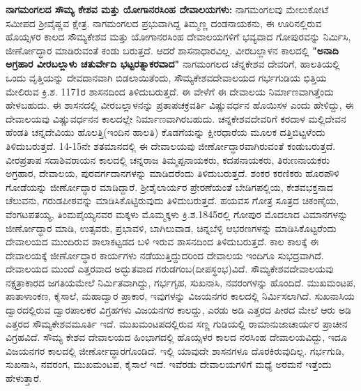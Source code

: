 \textbf{ನಾಗಮಂಗಲದ ಸೌಮ್ಯ ಕೇಶವ ಮತ್ತು ಯೋಗಾನರಸಿಂಹ ದೇವಾಲಯಗಳು:} ನಾಗಮಂಗಲವು ಮೇಲುಕೋಟೆ ಸಮೀಪದ ಶ‍್ರೀವೈಷ್ಣವ ಕ್ಷೇತ್ರ. ನಾಗಮಂಗಲದ ಪ್ರಭುವಾಗಿದ್ದ ತಿಮ್ಮಣ್ಣ ದಂಡನಾಯಕನು, ಈ ಊರಿನಲ್ಲಿರುವ ಹೊಯ್ಸಳರ ಕಾಲದ ಸೌಮ್ಯಕೇಶವ ಮತ್ತು ಯೋಗಾನರಸಿಂಹ ದೇವಾಲಯಗಳಿಗೆ ಭವ್ಯವಾದ ಗೋಪುರವನ್ನು ನಿರ್ಮಿಸಿ, ಜೀರ್ಣೋದ್ಧಾರ ಮಾಡಿರುವಂತೆ ಕಂಡು ಬರುತ್ತದೆ. ಆದರೆ ಶಾಸನಾಧಾರವಿಲ್ಲ. ವೀರಬಲ್ಲಾಳನ ಕಾಲದಲ್ಲಿ \textbf{"ಅನಾದಿ ಅಗ್ರಹಾರ ವೀರಬಲ್ಲಾಳು ಚತುರ್ವೇದಿ ಭಟ್ಟರತ್ನಾಕರವಾದ"} ನಾಗಮಂಗಲದ ಚೆನ್ನಕೇಶವ ದೇವರಿಗೆ, ಹಾಲತಿಯಲ್ಲಿ ಒಂದು ವೃತ್ತಿಯನ್ನು ದೇವದಾನವಾಗಿ ಬಿಡಲಾಯಿತೆಂದು, ಸೌಮ್ಯಕೇಶವದೇವಾಲಯದ ಗರ್ಭಗುಡಿಯ ಭಿತ್ತಿಯ ಮೇಲಿರುವ ಕ್ರಿ.ಶ. 1171ರ ಶಾಸನದಿಂದ ತಿಳಿದುಬರುತ್ತದೆ. ಈ ವೇಳೆಗೆ ಈ ದೇವಾಲಯ ನಿರ್ಮಾಣವಾಗಿತ್ತೆಂದು ಹೇಳಬಹುದು. ಈ ಶಾಸನದಲ್ಲಿ ವೀರಬಲ್ಲಾಳನನ್ನು ಪ್ರತಾಪಚಕ್ರವರ್ತಿ ವಿಷ್ಣುವರ್ಧನ ಹೊಯಿಸಳ ಎಂದು ಹೇಳಿದ್ದು, ಈ ದೇವಾಲಯವು ವಿಷ್ಣುವರ್ಧನನ ಕಾಲದಲ್ಲೇ ನಿರ್ಮಾಣ\-ವಾಗಿರಬಹುದು. ಚನ್ನಕೇಶವದೇವರಿಗೆ ಕರದಾಳ ಮಲ್ಲಿದೇವನ ಹೆಂಡತಿ ಚನ್ನದೇವಿಯು ಹೊಲತ್ತಿ(ಇಂದಿನ ಹಾಲತಿ) ಕೊಡಗೆಯನ್ನು ಕ್ಷೀರಧಾರೆಯ ಮೂಲಕ ದತ್ತಿಬಿಟ್ಟಳೆಂದು ತಿಳಿದುಬರುತ್ತದೆ. 14-15ನೇ ಶತಮಾನದಲ್ಲಿ ಈ ದೇವಾಲಯವು ಜೀರ್ಣೋದ್ಧಾರವಾಗಿರುವಂತೆ ಕಂಡುಬರುತ್ತದೆ. ವೀರಪ್ರತಾಪ ಸದಾಶಿವರಾಯನ ಕಾಲದಲ್ಲಿ ಚನ್ನರಾಜ ತಿಮ್ಮಪ್ಪನಾಯಕರು, ಕದಪನಾಯಕರು, ತಿರುಣನಾಯಕರು ಅಗ್ರಹಾರ, ದೇವಾಲಯ, ಪುರವರ್ಗದಾನಗಳನ್ನು ಮಾಡಿದರೆಂದು ತಿಳಿದುಬರುತ್ತದೆ. ಶಂಕರ ಕರಣಿಕರು ಹೊರಪೌಳಿ ಗೋಡೆಯನ್ನು ಜೀರ್ಣೋದ್ಧಾರ ಮಾಡಿದ್ದಾರೆ. ಶ‍್ರೀಶೈಲಾರ್ಯರ ಪ್ರೇರಣೆಯಂತೆ ಬೇಡಿಗಪಲ್ಲಿಯ, ಕೇಶವಭಕ್ತನಾದ ಚೆಲುವನು, ಗರುಡಪೀಠವನ್ನು ಮಾಡಿಸಿಕೊಟ್ಟಿರುವುದು ತಿಳಿದುಬರುತ್ತದೆ. ಹಯವಸ ಗೋತ್ರ ಸೂತ್ರದ ಚಿಕಂಣೈಯ, ವೆಂಗಟಪತಯ್ಯ, ತಿಂಮಪೈಯ್ಯನವರ ಮಕ್ಕಳು ಮೊಮ್ಮಕ್ಕಳು ಕ್ರಿ.ಶ.1845ರಲ್ಲಿ ಗೋಪುರ ಮೊದಲಾದ ವಿಮಾನ\-ಗಳನ್ನು ಜೀರ್ಣೋದ್ಧಾರ ಮಾಡಿ, ಉತ್ಸವರು, ಪ್ರಭಾವಳಿ, ಬಾಗಿಲುವಾಡ, ಚಿನ್ನಬೆಳ್ಳಿ ಆಭರಣಗಳನ್ನು ಮಾಡಿಸಿಕೊಟ್ಟರೆಂದು ದೇವಾಲಯದ ಮುಂದಿರುವ ಶಾಲಾಕಟ್ಟಡದ ಬಳಿ ಇರುವ ಶಾಸನದಿಂದ ತಿಳಿದುಬರುತ್ತದೆ. ಕಾಲ ಕಾಲಕ್ಕೆ ಈ ದೇವಾಲಯಕ್ಕೆ ಜೀರ್ಣೋದ್ಧಾರ ಕಾರ್ಯಗಳು ನಡೆಯುತ್ತಿದ್ದುದರಿಂದ ದೇವಾಲಯ ಇಂದಿಗೂ ಸುಭದ್ರವಾಗಿದೆ. ದೇವಾಲಯದ ಮುಂದೆ ಎತ್ತರವಾದ ಅದ್ಭುತವಾದ ಗರುಡಗಂಬ(ದೀಪಸ್ಥಂಭ)ವಿದೆ. ಸೌಮ್ಯಕೇಶವದೇವಾಲಯವು ನಕ್ಷತ್ರಾ\-ಕಾರದ ಜಗತಿಯಮೇಲೆ ನಿರ್ಮಿತವಾಗಿದ್ದು, ಗರ್ಭಗೃಹ, ಸುಖನಾಸಿ, ನವರಂಗಳನ್ನು ಹೊಂದಿದೆ. ಮುಖಮಂಟಪ, ಪಾತಾಳಾಂಕಣ, ಕೈಸಾಲೆ, ಮಹಾದ್ವಾರ ಪ್ರಾಕಾರ, ಇವುಗಳನ್ನು ವಿಜಯನಗರ ಕಾಲದಲ್ಲಿ ನಿರ್ಮಿಸಲಾಗಿದೆ. ಸುಖನಾಸಿಯ ದ್ವಾರದಲ್ಲಿರುವ ದ್ವಾರಪಾಲಕರ ವಿಗ್ರಹಗಳು ವಿಜಯನಗರ ಕಾಲದ್ದು, ಎರಡು ಅಡಿ ಎತ್ತರದ ಪೀಠದ ಮೇಲೆ ಆರು ಅಡಿ ಎತ್ತರದ ಸೌಮ್ಯಕೇಶವಮೂರ್ತಿ ಇದೆ. ಮುಖಮಂಟಪದಲ್ಲಿರುವ ಸಣ್ಣ ಗುಡಿಯಲ್ಲಿ ರಾಮಾನುಜಾಚಾರ್ಯರ ಪ್ರಾಚೀನ ವಿಗ್ರಹವಿದೆ. ಸೌಮ್ಯ ಕೇಶವ ದೇವಾಲಯದ ಹಿಂಭಾಗದಲ್ಲಿ ಹೊಯ್ಸಳರ ಕಾಲದ ನರಸಿಂಹ ದೇವಾಲಯವಿದ್ದು, ಇದೂ ವಿಜಯನಗರ ಕಾಲದಲ್ಲಿ ಜೀರ್ಣೋದ್ಧಾರಗೊಂಡಿದೆ. ಇಲ್ಲಿ ಯಾವುದೇ ಶಾಸನಗಳೂ ದೊರಕಿರುವುದಿಲ್ಲ. ಗರ್ಭಗುಡಿ, ಸುಖನಾಸಿ, ನವರಂಗ, ಮುಖಮಂಟಪ, ಕೈಸಾಲೆ ಇದೆ. ಇವೆರಡು ದೇವಾಲಯಗಳಿಗೆ ಮಧ್ಯೆ ಅರಮನೆ ಇತ್ತೆಂದು ಹೇಳುತ್ತಾರೆ.


